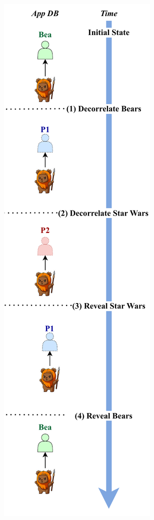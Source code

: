 \begin{figure}
    \centering
    \begin{subfigure}[t]{.47\columnwidth}
    \centering
    \includegraphics[width=.75\textwidth]{figs/composition-hl-inorder}

\end{subfigure}
\end{figure}

